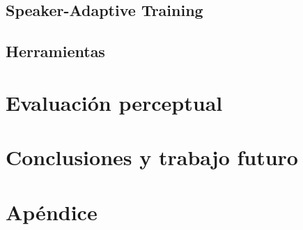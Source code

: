 \documentclass[11pt,a4paper,twoside]{tesis}
\begin{document}
\section{Speaker-Adaptive Training}\label{speakerAdaptativeTraining}


\section{Herramientas} \label{herramientas}

\chapter{Evaluación perceptual}\label{evaluacionPerceptual}




\chapter{Conclusiones y trabajo futuro}


\pagebreak
\chapter{Apéndice}

\pagebreak

\pagebreak


\backmatter
%
\end{document}
